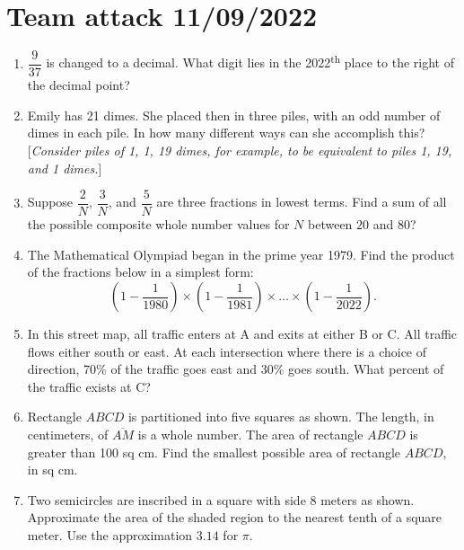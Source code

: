 \documentclass[11pt]{article}
\begin{document}
  \pagestyle{empty}
  \section*{Team attack 11/09/2022}
  \begin{enumerate}[leftmargin=3mm]
    \item $\dfrac{9}{37}$ is changed to a decimal. What digit lies in the 2022\textsuperscript{th} place to the right of the decimal point? %
    \item Emily has 21 dimes. She placed then in three piles, with an odd number of dimes in each pile. In how many different ways can she accomplish this? [\emph{Consider piles of 1, 1, 19 dimes, for example, to be equivalent to piles 1, 19, and 1 dimes.}] %
    \item Suppose $\dfrac{2}{N}$, $\dfrac{3}{N}$, and $\dfrac{5}{N}$ are three fractions in lowest terms. Find a sum of all the possible composite whole number values for $N$ between $20$ and $80$? %
    \item The Mathematical Olympiad began in the prime year 1979. Find the product of the fractions below in a simplest form:
    \[ 
      \left(1 - \frac{1}{1980}\right) \times \left(1 - \frac{1}{1981}\right) \times \ldots \times \left(1 - \frac{1}{2022}\right). 
    \] %
    \item In this street map, all traffic enters at A and exits at either B or C. All traffic flows either south or east. At each intersection where there is a choice of direction, 70\% of the traffic goes east and 30\% goes south. What percent of the traffic exists at C? %
    \item Rectangle $ABCD$ is partitioned into five squares as shown. The length, in centimeters, of $\overline{AM}$ is a whole number. The area of rectangle $ABCD$ is greater than 100 sq cm. Find the smallest possible area of rectangle $ABCD$, in sq cm. %
    \item Two semicircles are inscribed in a square with side $8$ meters as shown. Approximate the area of the shaded region to the nearest tenth of a square meter. Use the approximation $3.14$ for $\pi$. %
  \end{enumerate}
\end{document}
